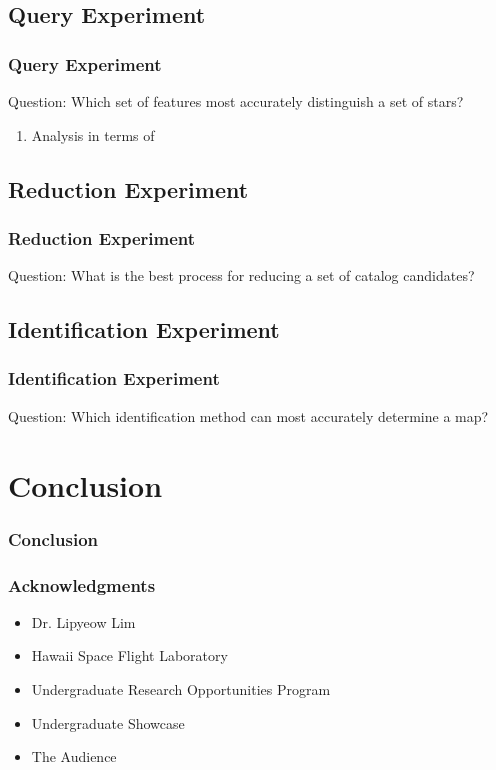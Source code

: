 \documentclass[11pt]{beamer}
\begin{document}
    \subsection{Query Experiment}\label{subsec:queryExperiment}
    \begin{frame}
        \frametitle{Query Experiment}
        \begin{block}{Question:}
            Which set of features most accurately distinguish a set of stars?
        \end{block}
        \begin{enumerate}
            \item Analysis in terms of
        \end{enumerate}
    \end{frame}

    \subsection{Reduction Experiment}\label{subsec:reductionExperiment}
    \begin{frame}
        \frametitle{Reduction Experiment}
        \begin{block}{Question:}
            What is the best process for reducing a set of catalog candidates?
        \end{block}
    \end{frame}

    \subsection{Identification Experiment}\label{subsec:identificationExperiment}
    \begin{frame}
        \frametitle{Identification Experiment}
        \begin{block}{Question:}
            Which identification method can most accurately determine a map?
        \end{block}
    \end{frame}

    \section{Conclusion}\label{sec:conclusion}
    \begin{frame}
        \frametitle{Conclusion}
    \end{frame}

    \begin{frame}
        \frametitle{Acknowledgments}
        \begin{itemize}
            \item Dr. Lipyeow Lim \medskip
            \item Hawaii Space Flight Laboratory \medskip
            \item Undergraduate Research Opportunities Program \medskip
            \item Undergraduate Showcase \medskip
            \item The Audience \medskip
        \end{itemize}
    \end{frame}

    \begin{frame}
    \end{frame}
\end{document}

